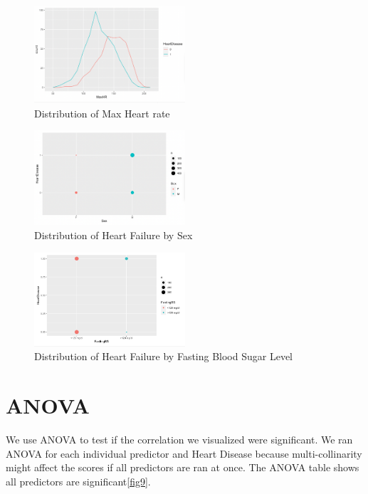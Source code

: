 \documentclass{article}
\begin{document}
\begin{figure}[h]
	\centering
	\includegraphics[width=0.5\textwidth]{images/dist5.PNG}
	\caption{Distribution of Max Heart rate}
	\label{fig6}
\end{figure}

\begin{figure}[h]
	\centering
	\includegraphics[width=0.5\textwidth]{images/dist6.PNG}
	\caption{Distribution of Heart Failure by Sex}
	\label{fig7}
\end{figure}

\begin{figure}[h]
	\centering
	\includegraphics[width=0.5\textwidth]{images/dist7.PNG}
	\caption{Distribution of Heart Failure by Fasting Blood Sugar Level}
	\label{fig8}
\end{figure}

\section{ANOVA}

We use ANOVA to test if the correlation we visualized were significant. We ran ANOVA for each individual predictor and Heart Disease because multi-collinarity might affect the scores if all predictors are ran at once. The ANOVA table shows all predictors are significant\ref{fig9}.
\end{document}

